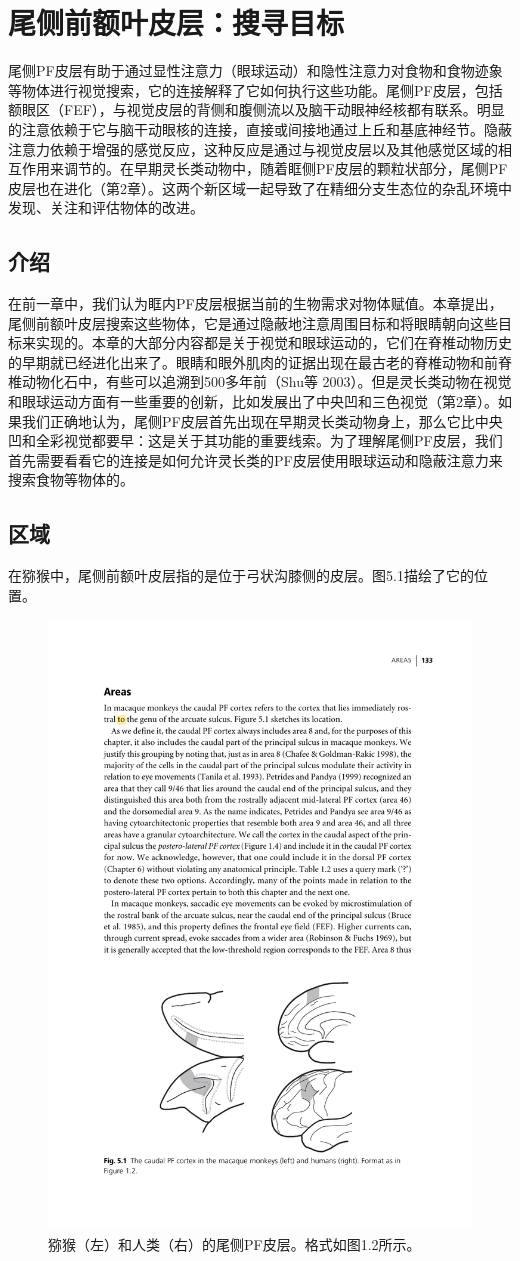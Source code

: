\chapter{尾侧前额叶皮层：搜寻目标}
尾侧PF皮层有助于通过显性注意力（眼球运动）和隐性注意力对食物和食物迹象等物体进行视觉搜索，它的连接解释了它如何执行这些功能。尾侧PF皮层，包括额眼区（FEF），与视觉皮层的背侧和腹侧流以及脑干动眼神经核都有联系。明显的注意依赖于它与脑干动眼核的连接，直接或间接地通过上丘和基底神经节。隐蔽注意力依赖于增强的感觉反应，这种反应是通过与视觉皮层以及其他感觉区域的相互作用来调节的。在早期灵长类动物中，随着眶侧PF皮层的颗粒状部分，尾侧PF皮层也在进化（第2章）。这两个新区域一起导致了在精细分支生态位的杂乱环境中发现、关注和评估物体的改进。

\section{介绍}
在前一章中，我们认为眶内PF皮层根据当前的生物需求对物体赋值。本章提出，尾侧前额叶皮层搜索这些物体，它是通过隐蔽地注意周围目标和将眼睛朝向这些目标来实现的。本章的大部分内容都是关于视觉和眼球运动的，它们在脊椎动物历史的早期就已经进化出来了。眼睛和眼外肌肉的证据出现在最古老的脊椎动物和前脊椎动物化石中，有些可以追溯到500多年前（Shu等 2003）。但是灵长类动物在视觉和眼球运动方面有一些重要的创新，比如发展出了中央凹和三色视觉（第2章）。如果我们正确地认为，尾侧PF皮层首先出现在早期灵长类动物身上，那么它比中央凹和全彩视觉都要早：这是关于其功能的重要线索。为了理解尾侧PF皮层，我们首先需要看看它的连接是如何允许灵长类的PF皮层使用眼球运动和隐蔽注意力来搜索食物等物体的。
\section{区域}
在猕猴中，尾侧前额叶皮层指的是位于弓状沟膝侧的皮层。图5.1描绘了它的位置。
\begin{figure}
	\centering
	\includegraphics[width=0.7\linewidth]{image_pfc/Fig_5_1}
	\caption{猕猴（左）和人类（右）的尾侧PF皮层。格式如图1.2所示。}
	\label{fig:fig}
\end{figure}

